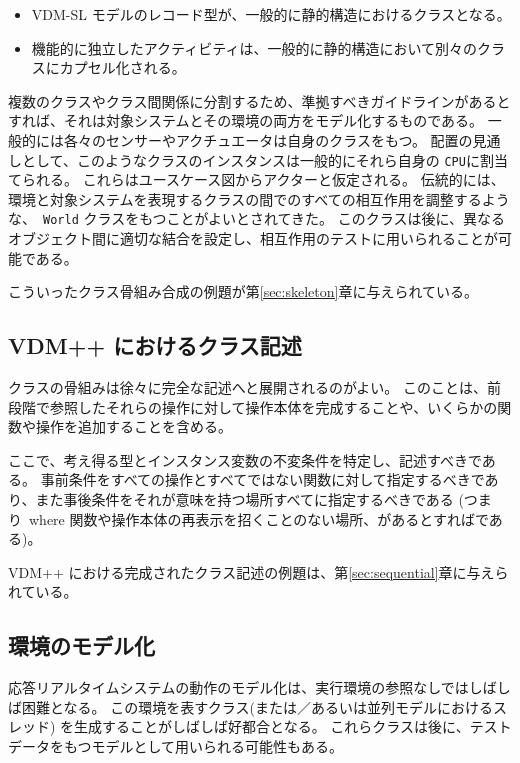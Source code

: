 \documentclass[\pformat,12pt]{jreport}
\begin{document}
\begin{itemize}
\item VDM-SL モデルのレコード型が、一般的に静的構造におけるクラスとなる。
\item 機能的に独立したアクティビティは、一般的に静的構造において別々のクラスにカプセル化される。
\end{itemize}

複数のクラスやクラス間関係に分割するため、準拠すべきガイドラインがあるとすれば、それは対象システムとその環境の両方をモデル化するものである。
一般的には各々のセンサーやアクチュエータは自身のクラスをもつ。
配置の見通しとして、このようなクラスのインスタンスは一般的にそれら自身の \texttt{CPU}に割当てられる。
これらはユースケース図からアクターと仮定される。
伝統的には、環境と対象システムを表現するクラスの間でのすべての相互作用を調整するような、　\texttt{World} クラスをもつことがよいとされてきた。
このクラスは後に、異なるオブジェクト間に適切な結合を設定し、相互作用のテストに用いられることが可能である。

こういったクラス骨組み合成の例題が第\ref{sec:skeleton}章に与えられている。

\subsection{VDM++ におけるクラス記述}

クラスの骨組みは徐々に完全な記述へと展開されるのがよい。
このことは、前段階で参照したそれらの操作に対して操作本体を完成することや、いくらかの関数や操作を追加することを含める。

ここで、考え得る型とインスタンス変数の不変条件を特定し、記述すべきである。
事前条件をすべての操作とすべてではない関数に対して指定するべきであり、また事後条件をそれが意味を持つ場所すべてに指定するべきである (つまり\ where 関数や操作本体の再表示を招くことのない場所、があるとすればである)。

VDM++ における完成されたクラス記述の例題は、第\ref{sec:sequential}章に与えられている。

\subsection{環境のモデル化}

応答リアルタイムシステムの動作のモデル化は、実行環境の参照なしではしばしば困難となる。
この環境を表すクラス(または／あるいは並列モデルにおけるスレッド) を生成することがしばしば好都合となる。
これらクラスは後に、テストデータをもつモデルとして用いられる可能性もある。
\end{document}
